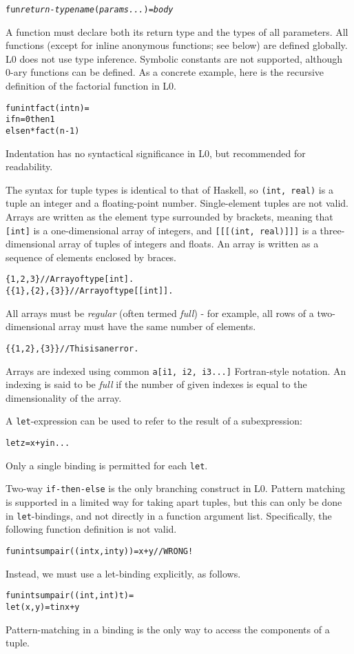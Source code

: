 \documentclass[oneside]{memoir}
\begin{document}
\begin{alltt}
  fun \textit{return-type} \textit{name}(\textit{params...}) = \textit{body}
\end{alltt}

A function must declare both its return type and the types of all
parameters.  All functions (except for inline anonymous functions; see
below) are defined globally.  L0 does not use type inference.
Symbolic constants are not supported, although 0-ary functions can be
defined.  As a concrete example, here is the recursive definition of
the factorial function in L0.
\begin{alltt}
  fun int fact(int n) =
    if n = 0 then 1
             else n * fact(n-1)
\end{alltt}
Indentation has no syntactical significance in L0, but recommended for
readability.

The syntax for tuple types is identical to that of Haskell, so
\texttt{(int, real)} is a tuple an integer and a floating-point
number.  Single-element tuples are not valid.  Arrays are written as
the element type surrounded by brackets, meaning that \texttt{[int]}
is a one-dimensional array of integers, and \texttt{[[[(int, real)]]]}
is a three-dimensional array of tuples of integers and floats.  An
array is written as a sequence of elements enclosed by braces.
\begin{alltt}
  \{1, 2, 3\}       // Array of type [int].
  \{\{1\}, \{2\}, \{3\}\} // Array of type [[int]].
\end{alltt}
All arrays must be \emph{regular} (often termed \emph{full}) - for
example, all rows of a two-dimensional array must have the same number
of elements.
\begin{alltt}
  \{\{1, 2\}, \{3\}\} // This is an error.
\end{alltt}
Arrays are indexed using common \texttt{a[i1, i2, i3...]}
Fortran-style notation.  An indexing is said to be \textit{full} if
the number of given indexes is equal to the dimensionality of the
array.

A \texttt{let}-expression can be used to refer to the result of a
subexpression:
\begin{alltt}
  let z = x + y in ...
\end{alltt}
Only a single binding is permitted for each \texttt{let}.

Two-way \texttt{if-then-else} is the only branching construct in L0.
Pattern matching is supported in a limited way for taking apart
tuples, but this can only be done in \texttt{let}-bindings, and not
directly in a function argument list.  Specifically, the following
function definition is not valid.
\begin{alltt}
  fun int sumpair((int x, int y)) = x + y // WRONG!
\end{alltt}
Instead, we must use a let-binding explicitly, as follows.
\begin{alltt}
  fun int sumpair((int, int) t) =
    let (x,y) = t in x + y
\end{alltt}
Pattern-matching in a binding is the only way to access the components
of a tuple.
\end{document}

